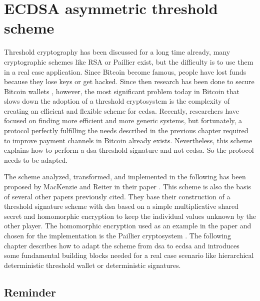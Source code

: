 \chapter{ECDSA asymmetric threshold scheme}
\label{chap:threshold}

Threshold cryptography has been discussed for a long time already, many
cryptographic schemes like RSA or Paillier \cite{10.1007/BFb0052253,
10.1007/978-3-642-27954-6_20} exist, but the difficulty is to use them in a real
case application. Since Bitcoin become famous, people have lost funds because they
lose keys or get hacked. Since then research has been done to secure Bitcoin
wallets \cite{Goldfeder2015SecuringBW, DBLP:conf/acns/GennaroGN16}, however, the
most significant problem today in Bitcoin that slows down the adoption of a
threshold cryptosystem is the complexity of creating an efficient and flexible
scheme for \gls{ecdsa}. Recently, researchers have focused on finding more efficient
and more generic systems, but fortunately, a protocol perfectly fulfilling the
needs described in the previous chapter required to improve payment channels in
Bitcoin already exists. Nevertheless, this scheme explains how to perform a
\gls{dsa} threshold signature and not \gls{ecdsa}. So the protocol needs to be
adapted.

The scheme analyzed, transformed, and implemented in the following has been
proposed by MacKenzie and Reiter in their paper  \cite{crypto-2001-1592}. This scheme is also the basis of several
other papers previously cited. They base their construction of a threshold signature
scheme with \gls{dsa} based on a simple multiplicative shared secret and
homomorphic encryption to keep the individual values unknown by the other
player. The homomorphic encryption used as an example in the paper and chosen for
the implementation is the Paillier cryptosystem
\cite{Paillier:1999:PCB:1756123.1756146}. The following chapter describes how to
adapt the scheme from \gls{dsa} to \gls{ecdsa} and introduces some fundamental
building blocks needed for a real case scenario like hierarchical deterministic
threshold wallet or deterministic signatures.

\minitoc

\newpage

\section{Reminder}

